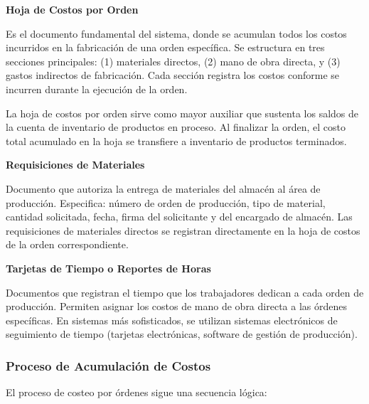\documentclass[
  stu,
  floatsintext,
  longtable,
  a4paper,
  nolmodern,
  notxfonts,
  notimes,
  12pt,
  colorlinks=true,linkcolor=blue,citecolor=blue,urlcolor=blue]{apa7}
\begin{document}
\textbf{Hoja de Costos por Orden}

Es el documento fundamental del sistema, donde se acumulan todos los
costos incurridos en la fabricación de una orden específica. Se
estructura en tres secciones principales: (1) materiales directos, (2)
mano de obra directa, y (3) gastos indirectos de fabricación. Cada
sección registra los costos conforme se incurren durante la ejecución de
la orden.

La hoja de costos por orden sirve como mayor auxiliar que sustenta los
saldos de la cuenta de inventario de productos en proceso. Al finalizar
la orden, el costo total acumulado en la hoja se transfiere a inventario
de productos terminados.

\textbf{Requisiciones de Materiales}

Documento que autoriza la entrega de materiales del almacén al área de
producción. Especifica: número de orden de producción, tipo de material,
cantidad solicitada, fecha, firma del solicitante y del encargado de
almacén. Las requisiciones de materiales directos se registran
directamente en la hoja de costos de la orden correspondiente.

\textbf{Tarjetas de Tiempo o Reportes de Horas}

Documentos que registran el tiempo que los trabajadores dedican a cada
orden de producción. Permiten asignar los costos de mano de obra directa
a las órdenes específicas. En sistemas más sofisticados, se utilizan
sistemas electrónicos de seguimiento de tiempo (tarjetas electrónicas,
software de gestión de producción).

\subsubsection{Proceso de Acumulación de
Costos}\label{proceso-de-acumulaciuxf3n-de-costos}

El proceso de costeo por órdenes sigue una secuencia lógica:
\end{document}
